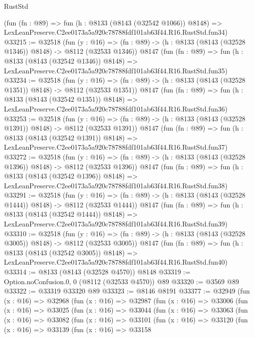 \begin{lexlean}{RustStd}
\begin{coremodule}
    (fun (fn : @89) =>
    fun (h : @8133 (@8143 (@32542 @1066)) @8148) =>
    LexLeanPreserve.C2ee0173a5a920c78788fdf101ab63f44.R16.RustStd.fun34)
@33215 := @32518
    (fun (y : @16) =>
    (fn : @89) -> (h : @8133 (@8143 (@32528 @1346)) @8148) -> @8112 (@32533 @1346))
    @8147
    (fun (fn : @89) =>
    fun (h : @8133 (@8143 (@32542 @1346)) @8148) =>
    LexLeanPreserve.C2ee0173a5a920c78788fdf101ab63f44.R16.RustStd.fun35)
@33234 := @32518
    (fun (y : @16) =>
    (fn : @89) -> (h : @8133 (@8143 (@32528 @1351)) @8148) -> @8112 (@32533 @1351))
    @8147
    (fun (fn : @89) =>
    fun (h : @8133 (@8143 (@32542 @1351)) @8148) =>
    LexLeanPreserve.C2ee0173a5a920c78788fdf101ab63f44.R16.RustStd.fun36)
@33253 := @32518
    (fun (y : @16) =>
    (fn : @89) -> (h : @8133 (@8143 (@32528 @1391)) @8148) -> @8112 (@32533 @1391))
    @8147
    (fun (fn : @89) =>
    fun (h : @8133 (@8143 (@32542 @1391)) @8148) =>
    LexLeanPreserve.C2ee0173a5a920c78788fdf101ab63f44.R16.RustStd.fun37)
@33272 := @32518
    (fun (y : @16) =>
    (fn : @89) -> (h : @8133 (@8143 (@32528 @1396)) @8148) -> @8112 (@32533 @1396))
    @8147
    (fun (fn : @89) =>
    fun (h : @8133 (@8143 (@32542 @1396)) @8148) =>
    LexLeanPreserve.C2ee0173a5a920c78788fdf101ab63f44.R16.RustStd.fun38)
@33291 := @32518
    (fun (y : @16) =>
    (fn : @89) -> (h : @8133 (@8143 (@32528 @1444)) @8148) -> @8112 (@32533 @1444))
    @8147
    (fun (fn : @89) =>
    fun (h : @8133 (@8143 (@32542 @1444)) @8148) =>
    LexLeanPreserve.C2ee0173a5a920c78788fdf101ab63f44.R16.RustStd.fun39)
@33310 := @32518
    (fun (y : @16) =>
    (fn : @89) -> (h : @8133 (@8143 (@32528 @3005)) @8148) -> @8112 (@32533 @3005))
    @8147
    (fun (fn : @89) =>
    fun (h : @8133 (@8143 (@32542 @3005)) @8148) =>
    LexLeanPreserve.C2ee0173a5a920c78788fdf101ab63f44.R16.RustStd.fun40)
@33314 := @8133 (@8143 (@32528 @4570)) @8148
@33319 := Option.noConfusion.{0, 0} (@8112 (@32533 @4570)) @89
@33320 := @3569 @89
@33322 := @33319 @33320 @89
@33323 := @8146 @8191
@33377 := @32949
    (fun (x : @16) =>
    @32968
      (fun (x : @16) =>
      @32987
        (fun (x : @16) =>
        @33006
          (fun (x : @16) =>
          @33025
            (fun (x : @16) =>
            @33044
              (fun (x : @16) =>
              @33063
                (fun (x : @16) =>
                @33082
                  (fun (x : @16) =>
                  @33101
                    (fun (x : @16) =>
                    @33120
                      (fun (x : @16) =>
                      @33139
                        (fun (x : @16) =>
                        @33158

\end{coremodule}
\end{lexlean}
